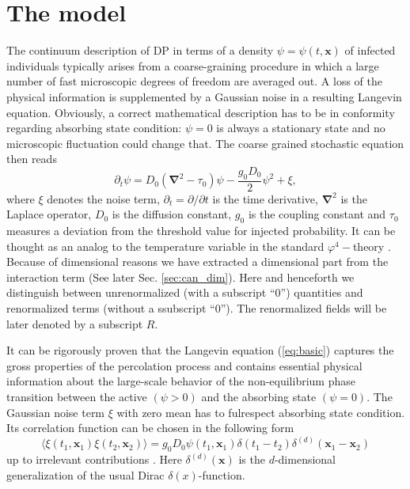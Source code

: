 \documentclass[aps,pre,url,twocolumn,superscriptaddress]{revtex4-1}
\def\mx{{\bm x}}
\def\boldnabla{{\bm \nabla}}
\begin{document}
\section{The model \label{sec:model}}
%
%
The continuum description of DP in terms of a density 
$\psi = \psi(t,\mx)$ of infected individuals typically arises from
a coarse-graining procedure in which a large number of
fast microscopic degrees of freedom are averaged out. A loss of the physical
information is supplemented by a Gaussian noise in a resulting Langevin equation.
Obviously, a correct mathematical description has to be in conformity regarding
absorbing state condition: $\psi = 0 $ is always a stationary state
and no microscopic fluctuation could change that. 
The coarse grained stochastic equation then reads \cite{JanTau04}
\begin{equation}
  \partial_t {\psi}  = D_0 (\boldnabla^2 - \tau_0)\psi  - 
   \frac{g_0 D_0}{2}\psi^2
  + \xi,
  \label{eq:basic}
\end{equation}
where $\xi$ denotes the noise term, $\partial_t = \partial / \partial t$ is
the time derivative, $\boldnabla^2$ is  the Laplace operator, $D_0$ 
is the diffusion constant, $g_0$ is the coupling constant and $\tau_0$ measures
 a deviation from the threshold value for injected probability. It can be thought
 as an analog to the temperature  variable in the standard $\varphi^4-$theory 
 \cite{JanTau04,Zinn}.
 Because of dimensional reasons we have extracted a 
 dimensional part from the interaction term (See later Sec. \ref{sec:can_dim}). 
Here and henceforth 
we distinguish between
unrenormalized (with a subscript ``0'') quantities and renormalized terms
(without a ssubscript ``0'').
 The renormalized fields will be later denoted by a subscript $R$.

 It can be rigorously proven \cite{Janssen81} that
the Langevin equation (\ref{eq:basic}) captures the gross properties
 of the percolation process and contains essential physical information about the
 large-scale behavior of the non-equilibrium phase 
 transition between the active $(\psi > 0)$ and the absorbing state $(\psi = 0)$.    
The Gaussian noise term $\xi$ with zero mean
 has to fulrespect absorbing state condition. Its
 correlation function can be chosen in the following form
\begin{equation}
   \langle \xi(t_1,\mx_1) \xi(t_2,\mx_2) \rangle = g_0 D_0 \psi(t_1,\mx_1) 
   \delta(t_1-t_2) \delta^{(d)}(\mx_1 - \mx_2)
   \label{eq:noise_correl}
\end{equation}
up to irrelevant contributions \cite{Tauber2014}. Here $\delta^{(d)}(\mx) $ 
is the $d$-dimensional generalization of the usual Dirac $\delta(x)$-function.
%
% 
\end{document}
